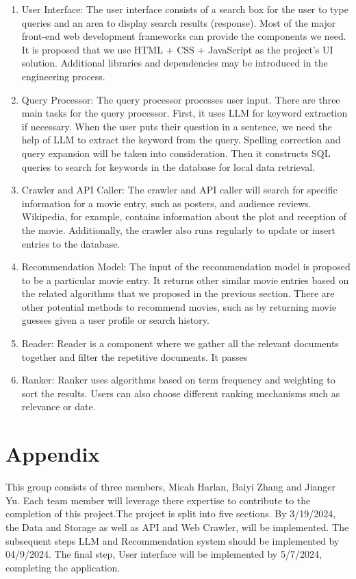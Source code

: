 \documentclass[journal]{IEEEtran}
\begin{document}
\begin{enumerate}
    \item  {User Interface}: The user interface consists of a search box for the user to type queries and an area to display search results (response). Most of the major front-end web development frameworks can provide the components we need. It is proposed that we use HTML + CSS + JavaScript as the project’s UI solution. Additional libraries and dependencies may be introduced in the engineering process.

    \item {Query Processor}: The query processor processes user input. There are three main tasks for the query processor. First, it uses LLM for keyword extraction if necessary. When the user puts their question in a sentence, we need the help of LLM to extract the keyword from the query. Spelling correction and query expansion will be taken into consideration. Then it constructs SQL queries to search for keywords in the database for local data retrieval.

    \item {Crawler and API Caller}: The crawler and API caller will search for specific information for a movie entry, such as posters, and audience reviews. Wikipedia, for example, contains information about the plot and reception of the movie. Additionally, the crawler also runs regularly to update or insert entries to the database.

    \item {Recommendation Model}: The input of the recommendation model is proposed to be a particular movie entry. It returns other similar movie entries based on the related algorithms that we proposed in the previous section. There are other potential methods to recommend movies, such as by returning movie guesses given a user profile or search history.

    \item {Reader}: Reader is a component where we gather all the relevant documents together and filter the repetitive documents. It passes 

    \item {Ranker}: Ranker uses algorithms based on term frequency and weighting to sort the results. Users can also choose different ranking mechanisms such as relevance or date.
\end{enumerate}

\section{Appendix}
This group consists of three members, Micah Harlan, Baiyi Zhang and Jianger Yu. Each team member will leverage there expertise to contribute to the completion of this project.The project is split into five sections. By 3/19/2024, the Data and Storage as well as API and Web Crawler, will be implemented. The subsequent steps LLM and Recommendation system should be implemented by 04/9/2024. The final step, User interface will be implemented by 5/7/2024, completing the application.



\end{document}

